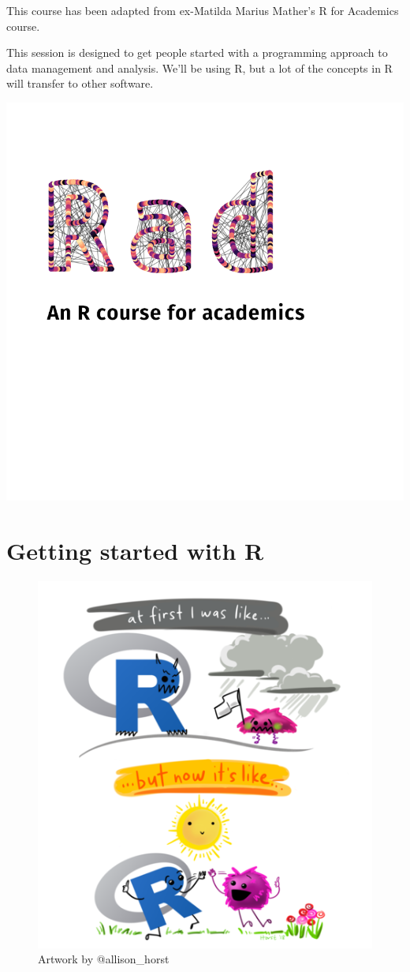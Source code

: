 \documentclass[
]{book}
\begin{document}
This course has been adapted from ex-Matilda Marius Mather's R for Academics course.

This session is designed to get people started with a programming approach to data management and analysis. We'll be using R, but a lot of the concepts in R will transfer to other software.

\includegraphics{Images/Cover.png}

\hypertarget{installing}{%
\chapter{Getting started with R}\label{installing}}

\begin{figure}
\centering
\includegraphics{Images/allisonhorst/r_first_then.png}
\caption{Artwork by @allison\_horst}
\end{figure}
\end{document}
